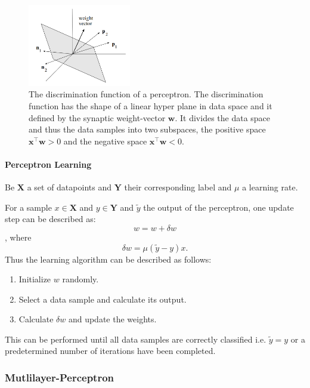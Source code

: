 \begin{figure}
	\centering
    	\includegraphics[width=0.4\textwidth]{imgs/percept_discr.png} 
    \caption{The discrimination function of a perceptron. The discrimination function has the shape of a linear hyper plane in data space and it defined by the synaptic weight-vector $\textbf{w}$. It divides the data space and thus the data samples into two subspaces, the positive space $\textbf{x}^{\intercal}\textbf{w} > 0$ and the negative space $\textbf{x}^{\intercal}\textbf{w} < 0$.}
	\label{fig:discrimation}
\end{figure}


\paragraph{Perceptron Learning}

Be $\textbf{X}$ a set of datapoints and $\textbf{Y}$ their corresponding label and $\mu$ a learning rate. 

For a sample $x \in \textbf{X}$  and $y \in \textbf{Y}$ and $\tilde{y}$ the output of the perceptron, one update step can be described as:
\[ 
	w = w + \delta w
\]
, where 
\[
	\delta w = \mu (\tilde{y}-y) x .
\]
Thus the learning algorithm can be described as follows:

\begin{enumerate}
	\item Initialize $w$ randomly.
	\item Select a data sample and calculate its output.
	\item  Calculate $\delta w$ and update the weights.
\end{enumerate}

This can be performed until all data samples are correctly classified i.e. $\tilde{y} = y$ or a predetermined number of iterations have been completed. 


\subsubsection{Mutlilayer-Perceptron}


